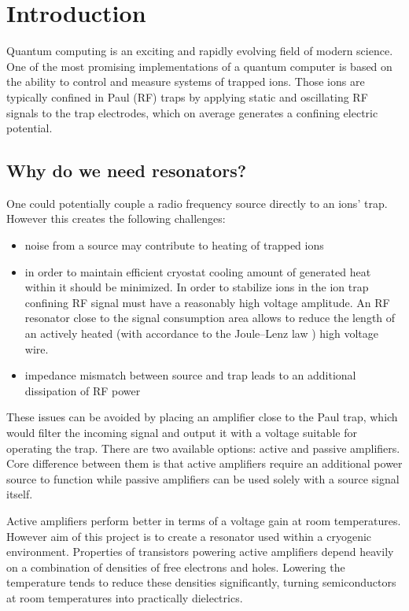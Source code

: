 \newcommand{\package}{\emph}

\chapter{Introduction}
Quantum computing is an exciting and rapidly evolving field of modern science. One of the most promising implementations of a quantum computer is based on the ability to control and measure systems of trapped ions. Those ions are typically confined in Paul (RF) \cite{Paul1990} traps by applying static and oscillating RF signals to the trap electrodes, which on average generates a confining electric potential.
\section{Why do we need resonators?}
\label{sec:why_resonators}
One could potentially couple a radio frequency source directly to an ions' trap. However this creates the following challenges:
\begin{itemize}
	\item noise from a source may contribute to heating of trapped ions \cite{Turchette2000}
	\item in order to maintain efficient cryostat cooling amount of generated heat within it should be minimized. In order to stabilize ions in the ion trap 	confining RF signal must have a reasonably high voltage amplitude. An RF resonator close to the signal consumption area allows to reduce the length of an actively heated (with accordance to the Joule–Lenz law \cite{Prokhorov1972}) high voltage wire.
	\item impedance mismatch between source and trap leads to an additional dissipation of RF power
\end{itemize}
These issues can be avoided by placing an amplifier close to the Paul trap, which would filter the incoming signal and output it with a voltage suitable for operating the trap. There are two available options: active and passive amplifiers. Core difference between them is that active amplifiers require an additional power source to function while passive amplifiers can be used solely with a source signal itself. 

Active amplifiers perform better in terms of a voltage gain at room temperatures. However aim of this project is to create a resonator used within a cryogenic environment. Properties of transistors powering active amplifiers depend heavily on a combination of densities of free electrons and holes. Lowering the temperature tends to reduce \cite{Dirac1926} these densities significantly, turning semiconductors at room temperatures into practically dielectrics. 

